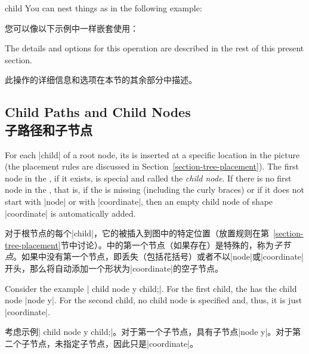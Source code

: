 \begin{pathoperation}{child}{
        }
    You can nest things as in the following example:
    
    您可以像以下示例中一样嵌套使用：

    \begin{codeexample}[]
\end{codeexample}

    The details and options for this operation are described in the rest of
    this present section.

    此操作的详细信息和选项在本节的其余部分中描述。

  \end{pathoperation}


\subsection{Child Paths and Child Nodes\\子路径和子节点}

For each |child| of a root node, its  is inserted at a
specific location in the picture (the placement rules are discussed in
Section~\ref{section-tree-placement}). The first node in the ,
if it exists, is special and called the \emph{child node}. If there is no first
node in the , that is, if the  is missing
(including the curly braces) or if it does not start with |node| or with
|coordinate|, then an empty child node of shape |coordinate| is automatically
added.

对于根节点的每个|child|，它的被插入到图中的特定位置（放置规则在第~\ref{section-tree-placement}节中讨论）。中的第一个节点（如果存在）是特殊的，称为\emph{子节点}。如果中没有第一个节点，即丢失（包括花括号）或者不以|node|或|coordinate|开头，那么将自动添加一个形状为|coordinate|的空子节点。

Consider the example | child {node {y}} child;|. For the first child,
the  has the child node |node {y}|. For the second child, no
child node is specified and, thus, it is just |coordinate|.

考虑示例| child {node {y}} child;|。对于第一个子节点，具有子节点|node {y}|。对于第二个子节点，未指定子节点，因此只是|coordinate|。

